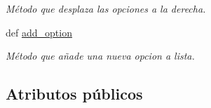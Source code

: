 \begin{DoxyCompactItemize}
\begin{DoxyCompactList}\small\item\em \-Método que desplaza las opciones a la derecha. \end{DoxyCompactList}\item 
def \hyperlink{classengine_1_1charactermenu_1_1GroupOption_a4c14295a9538edde3a344929e67755ab}{add\-\_\-option}
\begin{DoxyCompactList}\small\item\em \-Método que añade una nueva opcion a lista. \end{DoxyCompactList}\end{DoxyCompactItemize}
\subsection*{\-Atributos públicos}
